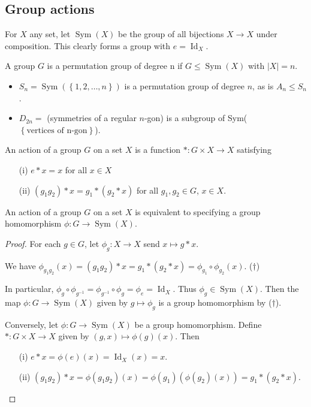 \documentclass[egregdoesnotlikesansseriftitles,a4paper]{scrartcl}
\begin{document}
\subsection{Group actions}
\begin{definition*}
      For $X$ any set, let $\operatorname{Sym}(X)$ be the group of all bijections $X \rightarrow X$ under composition. This clearly forms a group with $e=\operatorname{Id}_X$.

      A group $G$ is a permutation group of degree n if $G \leq \operatorname{Sym}(X)$ with $|X|=n$. 
\end{definition*}
\begin{example*}\hfill
      \begin{itemize}
           \item $S_{n}=\operatorname{Sym}(\left\{1,2,\ldots ,n\right\})$ is a permutation group of degree $n$, as is $A_{n}\leq S_{n}$.
           \item $D_{2n}=$ (symmetries of a regular $n$-gon) is a subgroup of Sym($\left\{\text{vertices of n-gon}\right\}$).
      \end{itemize}
\end{example*}
\begin{definition*}
      An action of a group $G$ on a set $X$ is a function $\ast: G \times X \rightarrow X$ satisfying 
      \begin{itemize}
           \item[(i)] $e \ast x =x $ for all $x \in X$ 
           \item[(ii)] $(g_1 g_2 )\ast x= g_1 \ast (g_2 \ast x)$ for all $g_1 ,g_2 \in G$, $x \in X$.
      \end{itemize}
\end{definition*}
\begin{proposition}
     An action of a group $G$ on a set $X$ is equivalent to specifying a group homomorphism $\phi: G \rightarrow \operatorname{Sym}(X)$.
\end{proposition}
\begin{proof}
      For each $g \in G$, let $\phi_{g}: X \rightarrow X$ send $x \mapsto g \ast x$. 

      We have $\phi_{g_1 g_2 }(x)=(g_1 g_2 )\ast x=g_1 \ast (g_2 \ast x)=\phi_{g_1 }\circ \phi_{g_2 }(x)$. ($\dagger$)

      In particular, $\phi_{g}\circ \phi_{{g}^{-1}}=\phi_{{g}^{-1}}\circ \phi_{g}=\phi_{e}=\operatorname{Id}_X$. Thus $\phi_{g} \in \operatorname{Sym}(X)$. Then the map $\phi: G \rightarrow \operatorname{Sym}(X)$ given by $g \mapsto \phi_{g}$ is a group homomorphism by ($\dagger$).

      Conversely, let $\phi: G \rightarrow \operatorname{Sym}(X)$ be a group homomorphism. Define $\ast: G \times X \rightarrow X$ given by $(g,x) \mapsto \phi (g)(x)$. Then
      \begin{itemize}
           \item[(i)] $e \ast x=\phi (e)(x)=\operatorname{Id}_X (x)=x$.
           \item[(ii)] $(g_1 g_2 )\ast x= \phi (g_1 g_2 )(x)=\phi (g_1 )(\phi (g_2)(x))=g_1 \ast (g_2 \ast x)$. 
      \end{itemize}
\end{proof}
\end{document}
